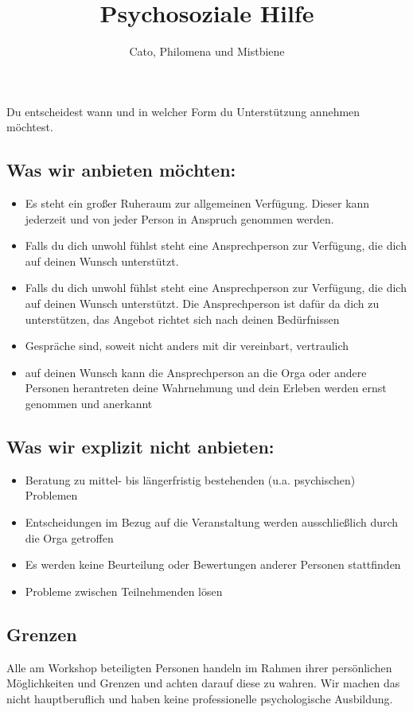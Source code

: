 \documentclass{article}
\title{Psychosoziale Hilfe}
\author{Cato, Philomena und Mistbiene}
\begin{document}
Du entscheidest wann und in welcher Form du Unterstützung annehmen möchtest.
\\
\subsection*{Was wir anbieten möchten:}
\begin{itemize}
    \item Es steht ein großer Ruheraum zur allgemeinen Verfügung. Dieser kann jederzeit und von jeder Person in Anspruch genommen werden.
    \item Falls du dich unwohl fühlst steht eine Ansprechperson zur Verfügung, die dich auf deinen Wunsch unterstützt.
    \item Falls du dich unwohl fühlst steht eine Ansprechperson zur Verfügung, die dich auf deinen Wunsch unterstützt. Die Ansprechperson ist dafür da dich zu unterstützen, das Angebot richtet sich nach deinen Bedürfnissen
    \item Gespräche sind, soweit nicht anders mit dir vereinbart, vertraulich
    \item auf deinen Wunsch kann die Ansprechperson an die Orga oder andere Personen herantreten
deine Wahrnehmung und dein Erleben werden ernst genommen und anerkannt
\end{itemize}

\subsection*{Was wir explizit nicht anbieten:}
\begin{itemize}
    \item Beratung zu mittel- bis längerfristig bestehenden (u.a. psychischen) Problemen
    \item Entscheidungen im Bezug auf die Veranstaltung werden ausschließlich durch die Orga getroffen
    \item Es werden keine Beurteilung oder Bewertungen anderer Personen stattfinden
    \item Probleme zwischen Teilnehmenden lösen
\end{itemize}
\subsection*{Grenzen}
Alle am Workshop beteiligten Personen handeln im Rahmen ihrer persönlichen Möglichkeiten und Grenzen und achten darauf diese zu wahren. Wir machen das nicht hauptberuflich und haben keine professionelle psychologische Ausbildung.
\end{document}
